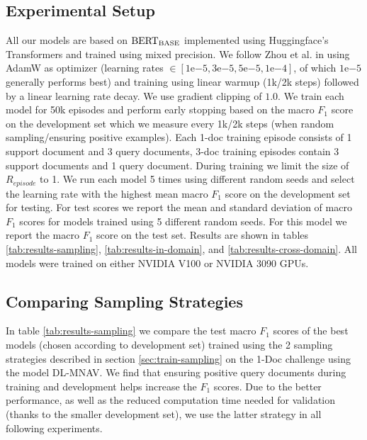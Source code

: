 \documentclass[11pt]{article}
\begin{document}
\subsection{Experimental Setup}
All our models are based on ${\textnormal{BERT}}_{\textnormal{BASE}}$ \cite{devlin_bert_2019} implemented using Huggingface's Transformers \cite{wolf_transformers_2020} and trained using mixed precision. We follow Zhou et al. \cite{zhou_document-level_2020} in using AdamW \cite{loshchilov_decoupled_2019} as optimizer (learning rates $\in [1\mathrm{e}{-5}, 3\mathrm{e}{-5}, 5\mathrm{e}{-5}, 1\mathrm{e}{-4}]$, of which $1\mathrm{e}{-5}$ generally performs best) and training using linear warmup (1k/2k steps) \cite{goyal_accurate_2017} followed by a linear learning rate decay. We use gradient clipping of $1.0$. We train each model for 50k episodes and perform early stopping based on the macro $F_1$ score on the development set which we measure every 1k/2k steps (when random sampling/ensuring positive examples). Each 1-doc training episode consists of 1 support document and 3 query documents, 3-doc training episodes contain 3 support documents and 1 query document. During training we limit the size of $R_{episode}$ to 1. We run each model 5 times using different random seeds and select the learning rate with the highest mean macro $F_1$ score on the development set for testing. For test scores we report the mean and standard deviation of macro $F_1$ scores for models trained using 5 different random seeds. For this model we report the macro $F_1$ score on the test set. Results are shown in tables \ref{tab:results-sampling}, \ref{tab:results-in-domain}, and \ref{tab:results-cross-domain}.
All models were trained on either NVIDIA V100 or NVIDIA 3090 GPUs.

\subsection{Comparing Sampling Strategies}

In table \ref{tab:results-sampling} we compare the test macro $F_1$ scores of the best models (chosen according to development set) trained using the 2 sampling strategies described in section \ref{sec:train-sampling} on the 1-Doc challenge using the model DL-MNAV. 
We find that ensuring positive query documents during training and development helps increase the $F_1$ scores.
Due to the better performance, as well as the reduced computation time needed for validation (thanks to the smaller development set), we use the latter strategy in all following experiments.
\end{document}
